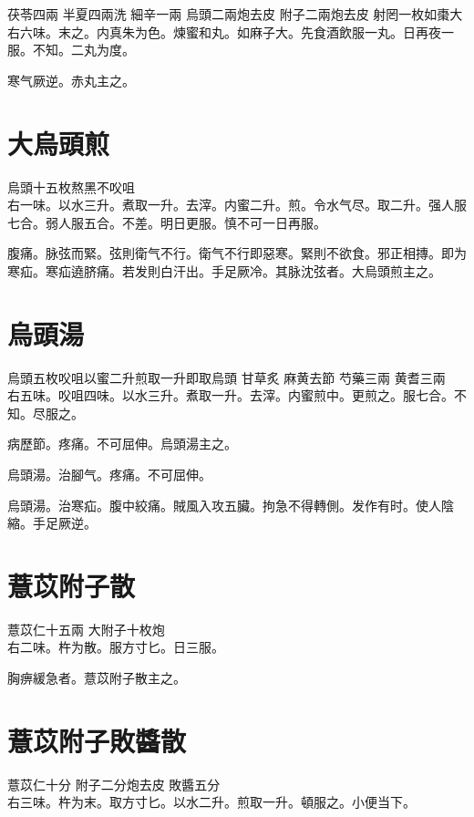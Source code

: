 茯苓{\scriptsize 四兩} 半夏{\scriptsize 四兩洗} 細辛{\scriptsize 一兩} 烏頭{\scriptsize 二兩炮去皮} 附子{\scriptsize 二兩炮去皮} 射罔{\scriptsize 一枚如棗大}\\
右六味。末之。内真朱为色。煉蜜和丸。如麻子大。先食酒飲服一丸。日再夜一服。不知。二丸为度。

寒气厥逆。赤丸主之。

\section{大烏頭煎}

烏頭{\scriptsize 十五枚熬黑不㕮咀}\\
右一味。以水三升。煮取一升。去滓。内蜜二升。煎。令水气尽。取二升。强人服七合。弱人服五合。不差。明日更服。慎不可一日再服。

腹痛。脉弦而緊。弦則衛气不行。{\khaaitp 衛气不行}即惡寒。緊則不欲食。邪正相摶。即为寒疝。寒疝遶脐痛。若发則白汗出。手足厥冷。其脉沈弦者。大烏頭煎主之。

\section{烏頭湯}

烏頭{\scriptsize 五枚㕮咀以蜜二升煎取一升即取烏頭} 甘草{\scriptsize 炙} 麻黄{\scriptsize 去節} 芍藥{\scriptsize 三兩} 黄耆{\scriptsize 三兩}\\
右五味。㕮咀四味。以水三升。煮取一升。去滓。内蜜煎中。更煎之。服七合。不知。尽服之。

病歷節。疼痛。不可屈伸。烏頭湯主之。

烏頭湯。治腳气。疼痛。不可屈伸。

烏頭湯。治寒疝。腹中絞痛。賊風入攻五臟。拘急不得轉側。发作有时。使人陰縮。手足厥逆。

\section{薏苡附子散}

薏苡仁{\scriptsize 十五兩} 大附子{\scriptsize 十枚炮}\\
右二味。杵为散。服方寸匕。日三服。

胸痹緩急者。薏苡附子散主之。

\section{薏苡附子敗醬散}

薏苡仁{\scriptsize 十分} 附子{\scriptsize 二分炮去皮} 敗醬{\scriptsize 五分}\\
右三味。杵为末。取方寸匕。以水二升。煎取一升。頓服之。小便当下。

